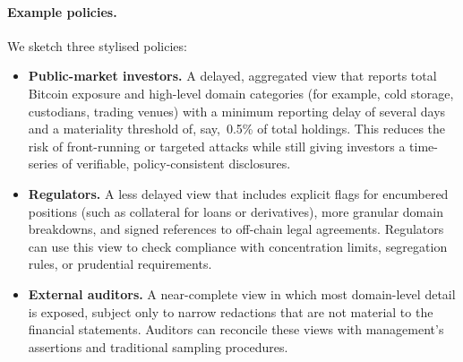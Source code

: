 \documentclass[11pt]{article}
\begin{document}
\paragraph{Example policies.}
We sketch three stylised policies:
\begin{itemize}[noitemsep]
\item \textbf{Public-market investors.} A delayed, aggregated view that reports total Bitcoin exposure and high-level domain categories (for example, cold storage, custodians, trading venues) with a minimum reporting delay of several days and a materiality threshold of, say,~0.5\% of total holdings.
This reduces the risk of front-running or targeted attacks while still giving investors a time-series of verifiable, policy-consistent disclosures.
\item \textbf{Regulators.} A less delayed view that includes explicit flags for encumbered positions (such as collateral for loans or derivatives), more granular domain breakdowns, and signed references to off-chain legal agreements.
Regulators can use this view to check compliance with concentration limits, segregation rules, or prudential requirements.
\item \textbf{External auditors.} A near-complete view in which most domain-level detail is exposed, subject only to narrow redactions that are not material to the financial statements.
Auditors can reconcile these views with management's assertions and traditional sampling procedures.
\end{itemize}
\end{document}
